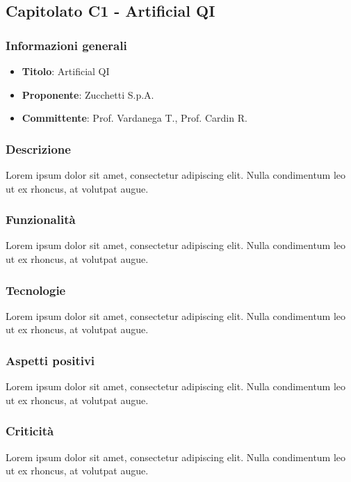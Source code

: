 \subsection{Capitolato C1 - Artificial QI}
    \subsubsection{Informazioni generali}
        \begin{itemize}
            \item \textbf{Titolo}: Artificial QI
            \item \textbf{Proponente}: Zucchetti S.p.A.
            \item \textbf{Committente}: Prof. Vardanega T., Prof. Cardin R.
        \end{itemize}
     \subsubsection{Descrizione}
    Lorem ipsum dolor sit amet, consectetur adipiscing elit. Nulla condimentum leo ut ex rhoncus, at volutpat augue.
     \subsubsection{Funzionalità}
    Lorem ipsum dolor sit amet, consectetur adipiscing elit. Nulla condimentum leo ut ex rhoncus, at volutpat augue.
    \subsubsection{Tecnologie}
    Lorem ipsum dolor sit amet, consectetur adipiscing elit. Nulla condimentum leo ut ex rhoncus, at volutpat augue.
    \subsubsection{Aspetti positivi}
    Lorem ipsum dolor sit amet, consectetur adipiscing elit. Nulla condimentum leo ut ex rhoncus, at volutpat augue.
    \subsubsection{Criticità}
    Lorem ipsum dolor sit amet, consectetur adipiscing elit. Nulla condimentum leo ut ex rhoncus, at volutpat augue.